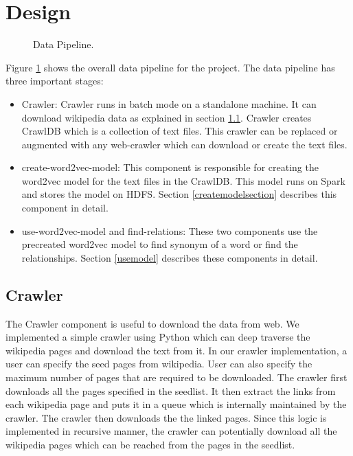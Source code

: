 \section{Design} \label{designsection}

\begin{figure}[htbp]
\centering
{}
\caption{Data Pipeline.}
\label{fig:datapipeline}
\end{figure}

Figure \ref{fig:datapipeline} shows the overall data pipeline for the
project. The data pipeline has three important stages:
\begin{itemize}
\item Crawler: Crawler runs in batch mode on a standalone machine. It can
download wikipedia data as explained in section \ref{crawlersection}. Crawler
 creates CrawlDB which is a collection of text files. This crawler can be
 replaced or augmented with any web-crawler which can download or create the
 text files.

\item create-word2vec-model: This component is responsible for creating the
word2vec model for the text files in the CrawlDB. This model runs on Spark
and stores the model on HDFS. Section \ref{createmodelsection} describes this
 component in detail.

\item use-word2vec-model and find-relations: These two components use the
precreated word2vec model to find synonym of a word or find the relationships.
Section \ref{usemodel} describes these components in detail.
\end{itemize}

\subsection{Crawler} \label{crawlersection}
The Crawler component is useful to download the data from web. We implemented
 a simple crawler using Python which can deep traverse the wikipedia pages
 and download the text from it. In our crawler implementation, a user can
 specify the seed pages from wikipedia. User can also specify the maximum
 number of pages that are required to be downloaded. The crawler first
 downloads all the pages specified in the seedlist. It then extract the links
  from each wikipedia page and puts it in a queue which is internally
  maintained by the crawler. The crawler then downloads the the linked pages.
   Since this logic is implemented in recursive manner, the crawler can
   potentially download all the wikipedia pages which can be reached from the
   pages in the seedlist.

